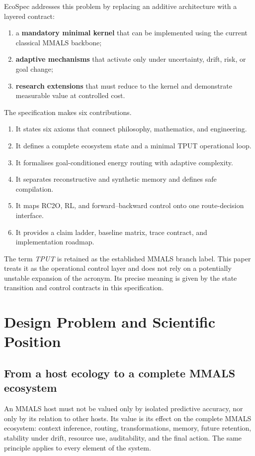 \documentclass[10pt]{article}
\begin{document}
EcoSpec addresses this problem by replacing an additive architecture with a layered contract:

\begin{enumerate}
  \item a \textbf{mandatory minimal kernel} that can be implemented using the current classical MMALS backbone;
  \item \textbf{adaptive mechanisms} that activate only under uncertainty, drift, risk, or goal change;
  \item \textbf{research extensions} that must reduce to the kernel and demonstrate measurable value at controlled cost.
\end{enumerate}

The specification makes six contributions.

\begin{enumerate}
  \item It states six axioms that connect philosophy, mathematics, and engineering.
  \item It defines a complete ecosystem state and a minimal TPUT operational loop.
  \item It formalises goal-conditioned energy routing with adaptive complexity.
  \item It separates reconstructive and synthetic memory and defines safe compilation.
  \item It maps RC2O, RL, and forward--backward control onto one route-decision interface.
  \item It provides a claim ladder, baseline matrix, trace contract, and implementation roadmap.
\end{enumerate}

The term \emph{TPUT} is retained as the established MMALS branch label. This paper treats it as the operational control layer and does not rely on a potentially unstable expansion of the acronym. Its precise meaning is given by the state transition and control contracts in this specification.

\section{Design Problem and Scientific Position}

\subsection{From a host ecology to a complete MMALS ecosystem}

An MMALS host must not be valued only by isolated predictive accuracy, nor only by its relation to other hosts. Its value is its effect on the complete MMALS ecosystem: context inference, routing, transformations, memory, future retention, stability under drift, resource use, auditability, and the final action. The same principle applies to every element of the system.
\end{document}
